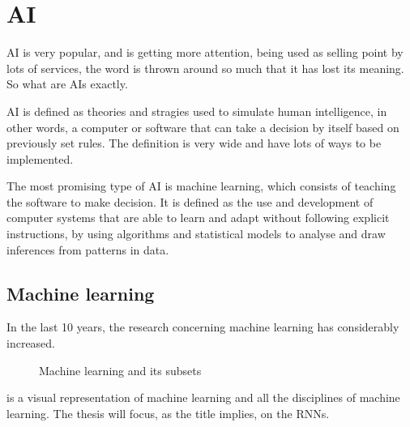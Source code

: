 \section{\acl{AI}}\label{sec:ai}

\acf{AI} is very popular, and is getting more attention, being used as selling point by lots of services, the word is thrown around so much that it has lost its meaning. So what are \acp{AI} exactly.

\ac{AI} is defined as theories and stragies used to simulate human intelligence, in other words, a computer or software that can take a decision by itself based on previously set rules. The definition is very wide and have lots of ways to be implemented.

The most promising type of \ac{AI} is machine learning, which consists of teaching the software to make decision. It is defined as the use and development of computer systems that are able to learn and adapt without following explicit instructions, by using algorithms and statistical models to analyse and draw inferences from patterns in data.

\subsection{Machine learning}

In the last 10 years, the research concerning machine learning has considerably increased.

\begin{figure}[H]
  \centering
  
  \caption{Machine learning and its subsets}
  \label{fig:ml}
\end{figure}

 is a visual representation of machine learning and all the disciplines of machine learning. The thesis will focus, as the title implies, on the \aclp{RNN}.
